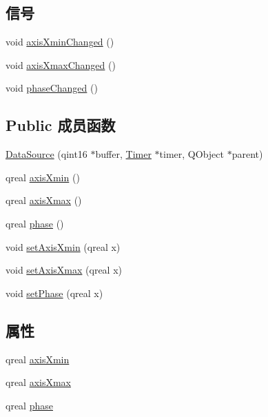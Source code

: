 \subsection*{信号}
\begin{DoxyCompactItemize}
\item 
void \hyperlink{class_data_source_a4e26914c46eb97ee3de4fec03cbb54e6}{axis\+Xmin\+Changed} ()
\item 
void \hyperlink{class_data_source_a709fe7d94ba3d2a86b487c132b295f8e}{axis\+Xmax\+Changed} ()
\item 
void \hyperlink{class_data_source_abd9b360e415e2e95e41837454d35443e}{phase\+Changed} ()
\end{DoxyCompactItemize}
\subsection*{Public 成员函数}
\begin{DoxyCompactItemize}
\item 
\hyperlink{class_data_source_adc0eb0527c0c7ea3fa924116078a9564}{Data\+Source} (qint16 $\ast$buffer, \hyperlink{class_timer}{Timer} $\ast$timer, Q\+Object $\ast$parent)
\item 
qreal \hyperlink{class_data_source_afe91344f3c61bab470d6daf522d9f0b9}{axis\+Xmin} ()
\item 
qreal \hyperlink{class_data_source_a6e3609869fd0f781ff7b3f8b0a8bcc63}{axis\+Xmax} ()
\item 
qreal \hyperlink{class_data_source_a2059193093f18defeabcd360d815a47a}{phase} ()
\item 
void \hyperlink{class_data_source_a0757ea4dea841dc0b9586d0830dcbb84}{set\+Axis\+Xmin} (qreal x)
\item 
void \hyperlink{class_data_source_a1d874305fb6c97fa1dc8174c51898c14}{set\+Axis\+Xmax} (qreal x)
\item 
void \hyperlink{class_data_source_af8bbe6caa786e6721da8e1ee570381de}{set\+Phase} (qreal x)
\end{DoxyCompactItemize}
\subsection*{属性}
\begin{DoxyCompactItemize}
\item 
qreal \hyperlink{class_data_source_a8222c7e324caaa4d802d6af493f7c53c}{axis\+Xmin}
\item 
qreal \hyperlink{class_data_source_ac03049a5aedd86f7f660c07d37541109}{axis\+Xmax}
\item 
qreal \hyperlink{class_data_source_a3e863a4ef50683165d94f418b3567486}{phase}
\end{DoxyCompactItemize}


